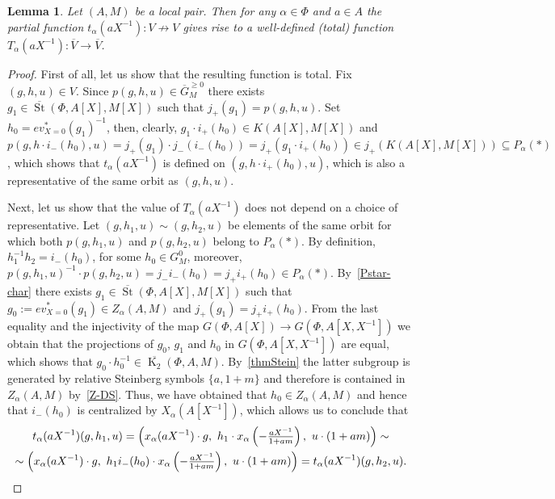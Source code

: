 \documentclass[oneside, 8pt]{amsart}
\newtheorem{lemma}{Lemma}
\theoremstyle{remark}
\theoremstyle{definition}
\DeclareMathOperator{\St}{St}
\DeclareMathOperator{\K}{K}
\numberwithin{equation}{section}
\begin{document}
\begin{lemma}\label{lem:orbit-action} Let $(A, M)$ be a local pair. 
Then for any $\alpha \in \Phi$ and $a \in A$ the partial function $t_\alpha(aX^{-1}) \colon V \not \to V$ gives rise to a well-defined (total) function $T_\alpha(aX^{-1}) \colon \overline{V} \to \overline{V}$. \end{lemma}
\begin{proof}
 First of all, let us show that the resulting function is total. 
 Fix $(g, h, u) \in V$. Since $p(g, h, u) \in \overline{G}^{\geq 0}_M$ there exists $g_1 \in \overline{\St}(\Phi, A[X], M[X])$ such that $j_+(g_1) = p(g, h, u).$
 Set $h_0 = ev^*_{X=0}(g_1)^{-1}$, then, clearly, $g_1 \cdot i_+(h_0) \in K(A[X], M[X])$ and 
 $p(g, h \cdot i_-(h_0), u) = j_+(g_1) \cdot j_-(i_-(h_0)) = j_+(g_1 \cdot i_+(h_0)) \in j_+(K(A[X], M[X])) \subseteq P_\alpha(*)$,
  which shows that $t_\alpha(aX^{-1})$ is defined on $(g, h \cdot i_+(h_0), u)$, which is also a representative of the same orbit as $(g, h, u)$.
  
 Next, let us show that the value of $T_\alpha(aX^{-1})$ does not depend on a choice of representative.
 Let $(g, h_1, u) \sim (g, h_2, u)$ be elements of the same orbit for which both $p(g, h_1, u)$ and $p(g, h_2, u)$ belong to $P_\alpha(*)$.
 By definition, $h_1^{-1} h_2 = i_-(h_0)$, for some $h_0 \in G^0_M$, moreover, 
  $p(g, h_1, u)^{-1} \cdot p(g, h_2, u) = j_- i_-(h_0) = j_+ i_+(h_0) \in P_\alpha(*)$.
 By~\cref{Pstar-char} there exists $g_1 \in \overline{\St}(\Phi, A[X], M[X])$ such that $g_0 := ev^*_{X=0}(g_1) \in Z_\alpha(A, M)$ and $j_+(g_1) = j_+ i_+ (h_0)$.
 From the last equality and the injectivity of the map $G(\Phi, A[X]) \to G(\Phi, A[X, X^{-1}])$ we obtain that
 the projections of $g_0$, $g_1$ and $h_0$ in $G(\Phi, A[X, X^{-1}])$ are equal, which shows that $g_0 \cdot h_0^{-1} \in \overline{\K_2}(\Phi, A, M)$. 
 By~\cref{thmStein} the latter subgroup is generated by relative Steinberg symbols $\{ a, 1 + m \}$ and therefore is contained in $Z_\alpha(A, M)$ by~\cref{Z-DS}. Thus, we have obtained that $h_0 \in Z_\alpha(A, M)$ and hence that $i_-(h_0)$ is centralized by $X_\alpha(A[X^{-1}])$, which allows us to conclude that
 \begin{multline} \nonumber
  t_\alpha(aX^{-1})(g, h_1, u) = \left( x_\alpha(aX^{-1})\cdot g ,\ h_1 \cdot x_\alpha\left(-\tfrac{aX^{-1}}{1 + am}\right),\ u \cdot (1 + am)\right) \sim \\
  \sim \left( x_\alpha(aX^{-1})\cdot g ,\ h_1 i_-(h_0) \cdot x_\alpha\left(-\tfrac{aX^{-1}}{1 + am}\right),\ u \cdot (1 + am)\right) = t_\alpha(aX^{-1})(g, h_2, u). \qedhere
 \end{multline} \end{proof}
\end{document}
